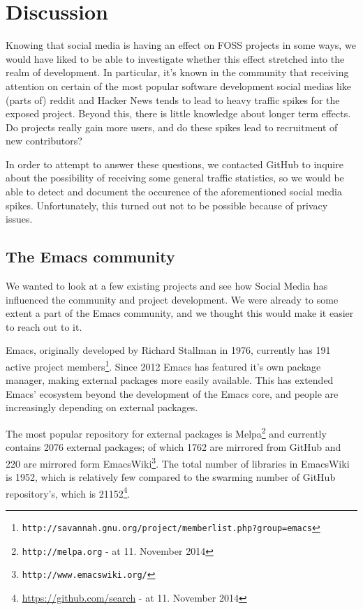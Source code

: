 \documentclass[a4paper,11pt]{article} %
\begin{document}
\section{Discussion}

Knowing that social media is having an effect on FOSS projects in some
ways, we would have liked to be able to investigate whether this
effect stretched into the realm of development. In particular, it's
known in the community that receiving attention on certain of the most
popular software development social medias like (parts of) reddit and
Hacker News tends to lead to heavy traffic spikes for the exposed
project. Beyond this, there is little knowledge about longer term
effects. Do projects really gain more users, and do these spikes lead
to recruitment of new contributors?

In order to attempt to answer these questions, we contacted GitHub to
inquire about the possibility of receiving some general traffic
statistics, so we would be able to detect and document the occurence
of the aforementioned social media spikes. Unfortunately, this turned
out not to be possible because of privacy issues.

\subsection{The Emacs community}

We wanted to look at a few existing projects and see how Social Media has
influenced the community and project development. We were already to some
extent a part of the Emacs community, and we thought this would make it
easier to reach out to it.

Emacs, originally developed by Richard Stallman in 1976, currently has
\num{191} active project
members\footnote{\texttt{http://savannah.gnu.org/project/memberlist.php?group=emacs}}.
Since \num{2012} Emacs has featured it's own package manager, making
external packages more easily available. This has extended Emacs' ecosystem
beyond the development of the Emacs core, and people are increasingly
depending on external packages.

The most popular repository for external packages is
Melpa\footnote{\texttt{http://melpa.org} - at 11. November 2014} and
currently contains \num{2076} external packages; of which \num{1762} are
mirrored from GitHub and \num{220} are mirrored form
EmacsWiki\footnote{\texttt{http://www.emacswiki.org/}}. The total number of
libraries in EmacsWiki is \num{1952}, which is relatively few compared to
the swarming number of GitHub repository's, which is
\num{21152}\footnote{\href{https://github.com/search?utf8=\%E2\%9C\%93\&q=language\%3Aemacs-lisp\&type=Repositories\&ref=searchresults}{https://github.com/search} - at 11. November 2014}.
\end{document}
